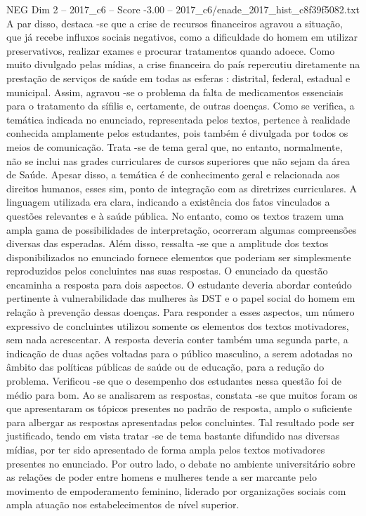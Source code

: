 \begin{textsample}{NEG Dim 2 – 2017\_c6 – Score -3.00 – 2017\_c6/enade\_2017\_hist\_c8f39f5082.txt}
A par disso, destaca -se que a crise de recursos financeiros agravou a situação, que já recebe influxos sociais negativos, como a dificuldade do homem em utilizar preservativos, realizar exames e procurar tratamentos quando adoece.
Como muito divulgado pelas mídias, a crise financeira do país repercutiu diretamente na prestação de serviços de saúde em todas as esferas : distrital, federal, estadual e municipal.
Assim, agravou -se o problema da falta de medicamentos essenciais para o tratamento da sífilis e, certamente, de outras doenças.
Como se verifica, a temática indicada no enunciado, representada pelos textos, pertence à realidade conhecida amplamente pelos estudantes, pois também é divulgada por todos os meios de comunicação.
Trata -se de tema geral que, no entanto, normalmente, não se inclui nas grades curriculares de cursos superiores que não sejam da área de Saúde.
Apesar disso, a temática é de conhecimento geral e relacionada aos direitos humanos, esses sim, ponto de integração com as diretrizes curriculares.
A linguagem utilizada era clara, indicando a existência dos fatos vinculados a questões relevantes e à saúde pública.
No entanto, como os textos trazem uma ampla gama de possibilidades de interpretação, ocorreram algumas compreensões diversas das esperadas.
Além disso, ressalta -se que a amplitude dos textos disponibilizados no enunciado fornece elementos que poderiam ser simplesmente reproduzidos pelos concluintes nas suas respostas.
O enunciado da questão encaminha a resposta para dois aspectos.
O estudante deveria abordar conteúdo pertinente à vulnerabilidade das mulheres às DST e o papel social do homem em relação à prevenção dessas doenças.
Para responder a esses aspectos, um número expressivo de concluintes utilizou somente os elementos dos textos motivadores, sem nada acrescentar.
A resposta deveria conter também uma segunda parte, a indicação de duas ações voltadas para o público masculino, a serem adotadas no âmbito das políticas públicas de saúde ou de educação, para a redução do problema.
Verificou -se que o desempenho dos estudantes nessa questão foi de médio para bom.
Ao se analisarem as respostas, constata -se que muitos foram os que apresentaram os tópicos presentes no padrão de resposta, amplo o suficiente para albergar as respostas apresentadas pelos concluintes.
Tal resultado pode ser justificado, tendo em vista tratar -se de tema bastante difundido nas diversas mídias, por ter sido apresentado de forma ampla pelos textos motivadores presentes no enunciado.
Por outro lado, o debate no ambiente universitário sobre as relações de poder entre homens e mulheres tende a ser marcante pelo movimento de empoderamento feminino, liderado por organizações sociais com ampla atuação nos estabelecimentos de nível superior.

\end{textsample}
